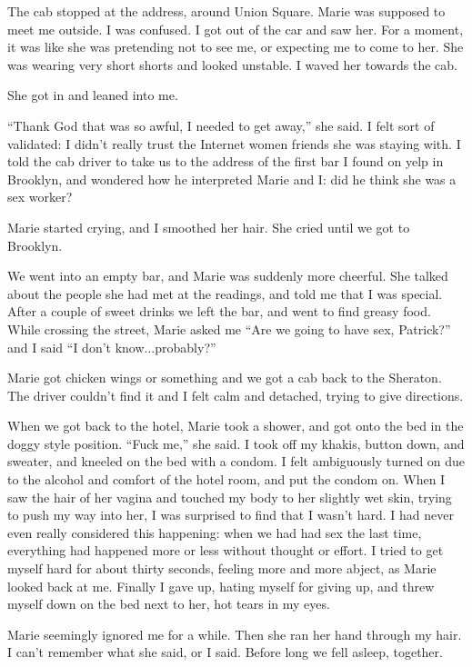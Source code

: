 \documentclass[12pt]{article}
\begin{document}
The cab stopped at the address, around Union Square.  Marie was supposed to meet
me outside. I was confused.  I got out of the car and saw her.  For a moment, it
was like she was pretending not to see me, or expecting me to come to her.  She
was wearing very short shorts and looked unstable.  I waved her towards the cab.  

She got in and leaned into me.

``Thank God that was so awful, I needed to get away,'' she said.  I felt sort of
validated: I didn't really trust the Internet women friends she was staying
with.  I told the cab driver to take us to the address of the first bar I found
on yelp in Brooklyn, and wondered how he interpreted Marie and I: did he think
she was a sex worker?  

Marie started crying, and I smoothed her hair.  She cried until we got to
Brooklyn.

We went into an empty bar, and Marie was suddenly more cheerful.  She talked
about the people she had met at the readings, and told me that I was special.
After a couple of sweet drinks we left the bar, and went to find greasy food.
While crossing the street, Marie asked me ``Are we going to have sex, Patrick?''
and I said ``I don't know...probably?''

Marie got chicken wings or something and we got a cab back to the Sheraton.  The
driver couldn't find it and I felt calm and detached, trying to give directions.  

When we got back to the hotel, Marie took a shower, and got onto the bed in the
doggy style position.  ``Fuck me,'' she said.  I took off my khakis, button down,
and sweater, and kneeled on the bed with a condom.  I felt ambiguously turned on
due to the alcohol and comfort of the hotel room, and put the condom on.  When I
saw the hair of her vagina and touched my body to her slightly wet skin, trying
to push my way into her, I was surprised to find that I wasn't hard.  I had
never even really considered this happening: when we had had sex the last time,
everything had happened more or less without thought or effort.  I tried to get
myself hard for about thirty seconds, feeling more and more abject, as Marie
looked back at me.  Finally I gave up, hating myself for giving up, and threw
myself down on the bed next to her, hot tears in my eyes.

Marie seemingly ignored me for a while. Then she ran her hand through my hair.
I can't remember what she said, or I said.  Before long we fell asleep,
together.
\end{document}
